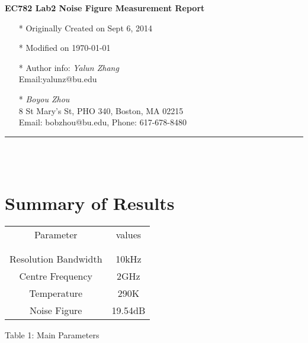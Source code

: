 \documentclass[]{article}
\begin{document}
\pagestyle{empty}
{\large\textbf{EC782 Lab2 Noise Figure Measurement Report}}

\begin{multicols}{2}

    \begin{itemize}
        \item[*] Originally Created on Sept 6, 2014
        \item[*] Modified on \today
        \item[*] Author info: \textit{Yalun Zhang}\\ 
                 Email:yalunz@bu.edu
                    
    \end{itemize}

    \columnbreak

    \begin{itemize}
        \item[ ]
        \item[ ]
        \item[*] \textit {Boyou Zhou}\\
                 8 St Mary's St, PHO 340, Boston, MA 02215\\
                 Email: bobzhou@bu.edu, Phone: 617-678-8480
    \end{itemize}

\end{multicols}

\rule[-0.1cm]{7.5in}{0.01cm}\\
\\
\indent		             
\section {Summary of Results}

\begin{center}
    \begin{tabular}{c c}
        Parameter & values \\ \\ \hline \\
        Resolution Bandwidth & 10kHz \\
        Centre Frequency & 2GHz \\
        Temperature & 290K \\
        Noise Figure & 19.54dB

    \end{tabular}
\end{center}

\begin{center}
    Table 1: Main Parameters 
\end{center}
\end{document}
